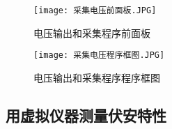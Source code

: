 \documentclass[UTF-8,twoside,cs4size]{ctexart}
\begin{document}
\begin{figure}[!h]
    \centering
    \begin{minipage}[b]{0.45\linewidth}
        \centering
        \texttt{[image: 采集电压前面板.JPG]}
        \caption{电压输出和采集程序前面板}
    \end{minipage}
    \quad %
    \begin{minipage}[b]{0.45\linewidth}
        \centering
        \texttt{[image: 采集电压程序框图.JPG]}
        \caption{电压输出和采集程序程序框图}
    \end{minipage}
\end{figure}

\subsection{用虚拟仪器测量伏安特性}
\end{document}
